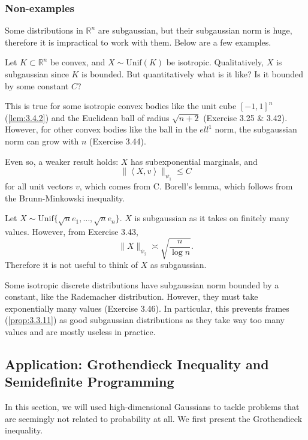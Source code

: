 \subsubsection{Non-examples}
Some distributions in $\mathbb{R}^n$ are subgaussian, but their subgaussian norm is huge, therefore it is 
impractical to work with them. Below are a few examples.

\begin{example}
\label{ex:3.4.6}
Let $K \subset \mathbb{R}^n$ be convex, and $X \sim \mathrm{Unif}(K)$ be isotropic. Qualitatively, $X$ is 
subgaussian since $K$ is bounded. But quantitatively what is it like? Is it bounded by some constant $C$?

This is true for some isotropic convex bodies like the unit cube $[-1, 1]^n$ (\cref{lem:3.4.2}) and 
the Euclidean ball of radius $\sqrt{n + 2}$ (Exercise 3.25 \& 3.42). However, for other convex bodies like the 
ball in the $ell^1$ norm, the subgaussian norm can grow with $n$ (Exercise 3.44).

Even so, a weaker result holds: $X$ has subexponential marginals, and 
\[ \lVert \left\langle X, v \right\rangle \rVert_{\psi_1} \leq C \]
for all unit vectors $v$, which comes from C. Borell's lemma, which follows from the Brunn-Minkowski inequality.
\end{example}

\begin{example}
\label{ex:3.4.7}
Let $X \sim \mathrm{Unif}\{\sqrt{n}e_1, \dots, \sqrt{n}e_n\}$. $X$ is subgaussian as it takes on finitely 
many values. However, from Exercise 3.43, 
\[ \lVert X \rVert_{\psi_2} \asymp \sqrt{\frac{n}{\log{n}}}. \]
Therefore it is not useful to think of $X$ as subgaussian.
\end{example}

\begin{example}
\label{ex:3.4.8}
Some isotropic discrete distributions have subgaussian norm bounded by a constant, like the Rademacher 
distribution. However, they must take exponentially many values (Exercise 3.46). In particular, this prevents 
frames (\cref{prop:3.3.11}) as good subgaussian distributions as they take way too many values and are mostly 
useless in practice.
\end{example}


\subsection{Application: Grothendieck Inequality and Semidefinite Programming}
In this section, we will used high-dimensional Gaussians to tackle problems that are seemingly not related 
to probability at all. We first present the Grothendieck inequality.

